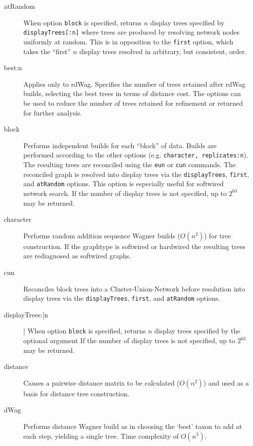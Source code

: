 	\begin{description}
		\item [atRandom] When option \texttt{block} is specified, returns $n$ display trees specified by 
		\texttt{displayTrees[:n]} where trees are produced by resolving network nodes uniformly at random. 
		This is in opposition to the \texttt{first} option, which takes the ``first'' $n$ display trees resolved 
		in arbitrary, but consistent, order.

		\item [best:n] Applies only to rdWag. Specifies the number of trees retained after rdWag builds, 
		selecting the best trees in terms of distance cost. The options can be used to reduce
		the number of trees retained for refinement or returned for further analysis. 

		\item[block] Performs independent builds for each ``block'' of data. Builds are performed according 
		to the other options (e.g. \texttt{character, replicates:n}). The resulting trees are reconciled using the 
		\texttt{eun} or \texttt{cun} commands. The reconciled graph is resolved into display trees via the 
		\texttt{displayTrees}, \texttt{first}, and \texttt{atRandom} options. This option is especially useful 
		for softwired network search. If the number of display trees is not specified, up to $2^{63}$ may be 
		returned.

		\item [character] Performs random addition sequence Wagner \citep{Farris1970} builds ($O(n^2)$) 
		for tree construction. If the graphtype is softwired or hardwired the resulting trees are rediagnosed 
		as softwired graphs.
		
		\item [cun] Reconciles block trees into a Cluster-Union-Network \citep{Baroni2005} before resolution 
		into display trees via the \texttt{displayTrees}, \texttt{first}, 	and \texttt{atRandom} options.

		\item [displayTrees:[n]] When option \texttt{block} is specified, returns $n$ display trees specified 
		by the optional argument If the number of display trees is not specified, up to $2^{63}$ may be returned.

		\item [distance] Causes a pairwise distance matrix to be calculated ($O(n^2)$) and used as a basis 
		for distance tree construction.
		
		\item [dWag] Performs distance Wagner build as in \citep{Farris1972} choosing the `best' taxon to 
		add at each step, yielding a single tree. Time complexity of $O(n^3)$.
		

\end{description}
